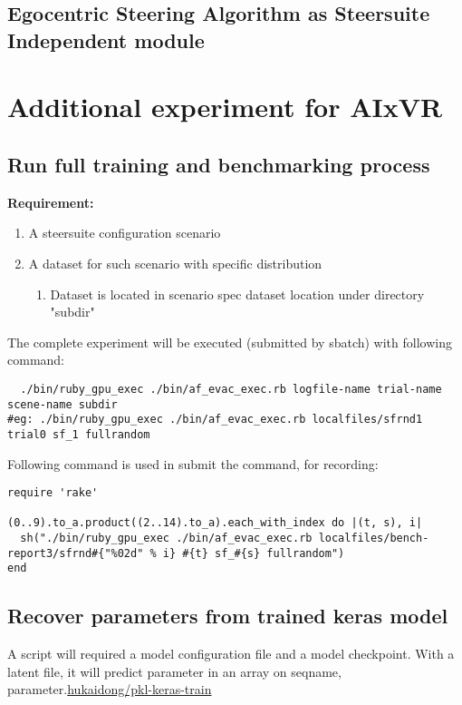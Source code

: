 \section{Egocentric Steering Algorithm as Steersuite Independent module} %
{}

\chapter{Additional experiment for AIxVR}

\section{Run full training and benchmarking process} %

\textbf{Requirement:}
\begin{enumerate}
  \item A steersuite configuration scenario
  \item A dataset for such scenario with specific distribution
    \begin{enumerate}
      \item Dataset is located in scenario spec dataset location under directory "subdir"
    \end{enumerate}
\end{enumerate}

The complete experiment will be executed (submitted by sbatch) with following command:
\begin{verbatim}
  ./bin/ruby_gpu_exec ./bin/af_evac_exec.rb logfile-name trial-name scene-name subdir
#eg: ./bin/ruby_gpu_exec ./bin/af_evac_exec.rb localfiles/sfrnd1 trial0 sf_1 fullrandom
\end{verbatim}

Following command is used in submit the command, for recording:
\begin{verbatim}
require 'rake'

(0..9).to_a.product((2..14).to_a).each_with_index do |(t, s), i|
  sh("./bin/ruby_gpu_exec ./bin/af_evac_exec.rb localfiles/bench-report3/sfrnd#{"%02d" % i} #{t} sf_#{s} fullrandom")
end
\end{verbatim}


\section{Recover parameters from trained keras model} %
A script will required a model configuration file and a model checkpoint. With 
a latent file, it will predict parameter in an array on {seqname, 
parameter}.\href{https://github.com/hukaidong/pkl-keras-train/tree/f97d8b71bf7a55fad0450452a32b71ddcf606fe9}{hukaidong/pkl-keras-train}

